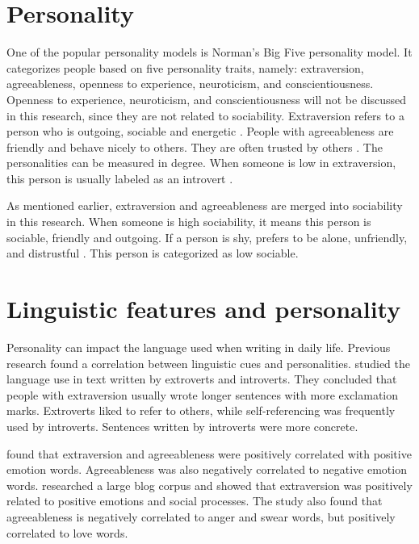 \documentclass[
10pt, %
a4paper, %
oneside, %
headinclude,footinclude, %
] {book}%
\begin{document}
\section{Personality}

One of the popular personality models is Norman's Big Five personality model. It categorizes people based on five personality traits, namely: extraversion, agreeableness, openness to experience, neuroticism, and conscientiousness. Openness to experience, neuroticism, and conscientiousness will not be discussed in this research, since they are not related to sociability. Extraversion refers to a person who is outgoing, sociable and energetic \citep{mccrae1992introduction}. People with agreeableness are friendly and behave nicely to others. They are often trusted by others \citep{costa1991facet}. The personalities can be measured in degree. When someone is low in extraversion, this person is usually labeled as an introvert \citep{eysenck1956inheritance}. 

As mentioned earlier, extraversion and agreeableness are merged into sociability in this research. When someone is high sociability, it means this person is sociable, friendly and outgoing. If a person is shy, prefers to be alone, unfriendly, and distrustful \citep{mccrae1992introduction}. This person is categorized as low sociable.

\section{Linguistic features and personality}

Personality can impact the language used when writing in daily life. Previous research found a correlation between linguistic cues and personalities. \citet{gill2002taking} studied the language use in text written by extroverts and introverts. They concluded that people with extraversion usually wrote longer sentences with more exclamation marks. Extroverts liked to refer to others, while self-referencing was frequently used by introverts. Sentences written by introverts were more concrete. 

\citet{pennebaker1999linguistic} found that extraversion and agreeableness were positively correlated with positive emotion words. Agreeableness was also negatively correlated to negative emotion words. \citet{yarkoni2010personality} researched a large blog corpus and showed that extraversion was positively related to positive emotions and social processes. The study also found that agreeableness is negatively correlated to anger and swear words, but positively correlated to love words.
\end{document}
